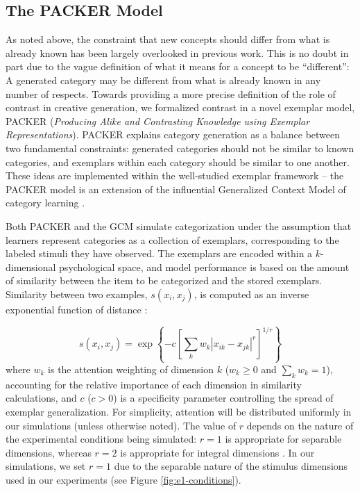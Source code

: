 \documentclass[12pt]{article}
\begin{document}
\begin{flushleft}
\subsection{The PACKER Model}

\label{section:PACKER-definition}

As noted above, the constraint that new concepts should differ from what is already known has been largely overlooked in previous work. This is no doubt in part due to the vague definition of what it means for a concept to be ``different'': A generated category may be different from what is already known in any number of respects. Towards providing a more precise definition of the role of contrast in creative generation, we formalized contrast in a novel exemplar model, PACKER  ({\em Producing Alike and Contrasting Knowledge using Exemplar Representations}). PACKER explains category generation as a balance between two fundamental constraints: generated categories should not be similar to known categories, and exemplars within each category should be similar to one another. These ideas are implemented within the well-studied exemplar framework -- the PACKER model is an extension of the influential Generalized Context Model of category learning \citep[GCM;][]{nosofsky1984choice,nosofsky1986attention}. 

Both PACKER and the GCM simulate categorization under the assumption that learners represent categories as a collection of exemplars, corresponding to the labeled stimuli they have observed. The exemplars are encoded within a $k$-dimensional psychological space, and model performance is based on the amount of similarity between the item to be categorized and the stored exemplars. Similarity between two examples, $s\left(x_i, x_j\right)$, is computed as an inverse exponential function of distance \citep[following][]{attneave1950,shepard1957stimulus,shepard1987toward}:

\begin{equation}
s\left(x_i,x_j\right) = \exp \left\{ -c \left[\sum_{k}{ w_k \left| x_{ik} - x_{jk} \right|^r }\right]^{1/r} \right\}
\label{eq:similarity}
\end{equation}
% 
where $w_k$ is the attention weighting of dimension $k$ ($w_k \geq 0$ and $\sum_k{w_k} = 1$), accounting for the relative importance of each dimension in similarity calculations, and $c$ ($c>0$) is a specificity parameter controlling the spread of exemplar generalization. For simplicity, attention will be distributed uniformly in our simulations (unless otherwise noted). The value of $r$ depends on the nature of the experimental conditions being simulated: $r=1$ is appropriate for separable dimensions, whereas $r=2$ is appropriate for integral dimensions \citep[see][]{shepard1964attention,garner1974processing}. In our simulations, we set $r=1$ due to the separable nature of the stimulus dimensions used in our experiments (see Figure \ref{fig:e1-conditions}).



\end{flushleft}
\end{document}
